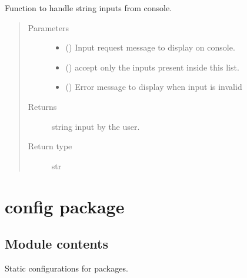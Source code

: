 \documentclass[letterpaper,10pt,english,openany,oneside]{sphinxmanual}
\begin{document}
\begin{fulllineitems}
\label{\detokenize{docs/source/common:common.input_handler.get_input_str}}
Function to handle string inputs from console.
\begin{quote}\begin{description}
\item[{Parameters}] \leavevmode\begin{itemize}
\item {} 
 () \textendash{} Input request message to display on console.

\item {} 
 () \textendash{} accept only the inputs present inside this list.

\item {} 
 () \textendash{} Error message to display when input is invalid

\end{itemize}

\item[{Returns}] \leavevmode
string input by the user.

\item[{Return type}] \leavevmode
str

\end{description}\end{quote}

\end{fulllineitems}



\chapter{config package}
\label{\detokenize{docs/source/config:config-package}}\label{\detokenize{docs/source/config::doc}}

\section{Module contents}
\label{\detokenize{docs/source/config:module-config}}\label{\detokenize{docs/source/config:module-contents}}
Static configurations for packages.
\end{document}
